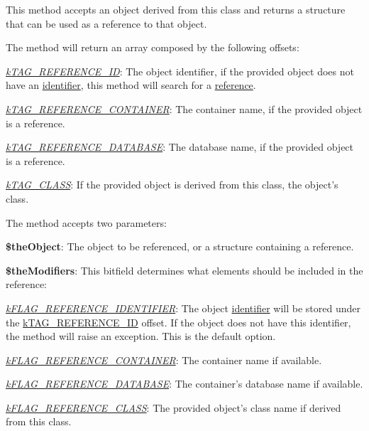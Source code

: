 This method accepts an object derived from this class and returns a structure that can be used as a reference to that object.

The method will return an array composed by the following offsets\-:


\begin{DoxyItemize}
\item {\itshape \hyperlink{}{k\-T\-A\-G\-\_\-\-R\-E\-F\-E\-R\-E\-N\-C\-E\-\_\-\-I\-D}}\-: The object identifier, if the provided object does not have an \hyperlink{}{identifier}, this method will search for a \hyperlink{}{reference}. 
\item {\itshape \hyperlink{}{k\-T\-A\-G\-\_\-\-R\-E\-F\-E\-R\-E\-N\-C\-E\-\_\-\-C\-O\-N\-T\-A\-I\-N\-E\-R}}\-: The container name, if the provided object is a reference. 
\item {\itshape \hyperlink{}{k\-T\-A\-G\-\_\-\-R\-E\-F\-E\-R\-E\-N\-C\-E\-\_\-\-D\-A\-T\-A\-B\-A\-S\-E}}\-: The database name, if the provided object is a reference. 
\item {\itshape \hyperlink{}{k\-T\-A\-G\-\_\-\-C\-L\-A\-S\-S}}\-: If the provided object is derived from this class, the object's class. 
\end{DoxyItemize}

The method accepts two parameters\-:


\begin{DoxyItemize}
\item {\bfseries \$the\-Object}\-: The object to be referenced, or a structure containing a reference. 
\item {\bfseries \$the\-Modifiers}\-: This bitfield determines what elements should be included in the reference\-: 
\begin{DoxyItemize}
\item {\itshape \hyperlink{}{k\-F\-L\-A\-G\-\_\-\-R\-E\-F\-E\-R\-E\-N\-C\-E\-\_\-\-I\-D\-E\-N\-T\-I\-F\-I\-E\-R}}\-: The object \hyperlink{}{identifier} will be stored under the \hyperlink{}{k\-T\-A\-G\-\_\-\-R\-E\-F\-E\-R\-E\-N\-C\-E\-\_\-\-I\-D} offset. If the object does not have this identifier, the method will raise an exception. This is the default option. 
\item {\itshape \hyperlink{}{k\-F\-L\-A\-G\-\_\-\-R\-E\-F\-E\-R\-E\-N\-C\-E\-\_\-\-C\-O\-N\-T\-A\-I\-N\-E\-R}}\-: The container name if available. 
\item {\itshape \hyperlink{}{k\-F\-L\-A\-G\-\_\-\-R\-E\-F\-E\-R\-E\-N\-C\-E\-\_\-\-D\-A\-T\-A\-B\-A\-S\-E}}\-: The container's database name if available. 
\item {\itshape \hyperlink{}{k\-F\-L\-A\-G\-\_\-\-R\-E\-F\-E\-R\-E\-N\-C\-E\-\_\-\-C\-L\-A\-S\-S}}\-: The provided object's class name if derived from this class. 
\end{DoxyItemize}
\end{DoxyItemize}

